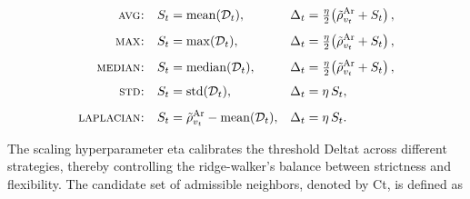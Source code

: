\begin{align}
\label{eq:ridge_avg}
\textsc{avg:}       && S_t &= \operatorname{mean}(\mathcal{D}_t),            
& \Delta_t &= \tfrac{\eta}{2}\!\left(\tilde{\rho}^{\mathrm{Ar}}_{v_t}+S_t\right), \\[4pt]
\label{eq:ridge_max}
\textsc{max:}       && S_t &= \max(\mathcal{D}_t),                            
& \Delta_t &= \tfrac{\eta}{2}\!\left(\tilde{\rho}^{\mathrm{Ar}}_{v_t}+S_t\right), \\[4pt]
\label{eq:ridge_median}
\textsc{median:}    && S_t &= \operatorname{median}(\mathcal{D}_t),           
& \Delta_t &= \tfrac{\eta}{2}\!\left(\tilde{\rho}^{\mathrm{Ar}}_{v_t}+S_t\right), \\[4pt]
\label{eq:ridge_std}
\textsc{std:}       && S_t &= \operatorname{std}(\mathcal{D}_t),              
& \Delta_t &= \eta\,S_t, \\[4pt]
\label{eq:ridge_laplacian}
\textsc{laplacian:} && S_t &= \tilde{\rho}^{\mathrm{Ar}}_{v_t}-\operatorname{mean}(\mathcal{D}_t), 
& \Delta_t &= \eta\,S_t.
\end{align}

The scaling hyperparameter \gls{eta} calibrates the threshold \gls{Deltat} across different strategies, thereby controlling the ridge-walker's balance between strictness and flexibility.
The candidate set of admissible neighbors, denoted by \gls{Ct}, is defined as

